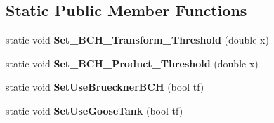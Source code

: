 \subsection*{Static Public Member Functions}
\begin{DoxyCompactItemize}
\item 
\mbox{\label{classOperator_a6f505221635444cb0b489b9ac600fd61}} 
static void {\bfseries Set\+\_\+\+B\+C\+H\+\_\+\+Transform\+\_\+\+Threshold} (double x)
\item 
\mbox{\label{classOperator_a2c42843a1a557f2ab568d106e8fd23e8}} 
static void {\bfseries Set\+\_\+\+B\+C\+H\+\_\+\+Product\+\_\+\+Threshold} (double x)
\item 
\mbox{\label{classOperator_a574e27d0c3ddc107b51eafcb6bfd4b99}} 
static void {\bfseries Set\+Use\+Brueckner\+B\+CH} (bool tf)
\item 
\mbox{\label{classOperator_a02668429f1779193801219a2b45e4776}} 
static void {\bfseries Set\+Use\+Goose\+Tank} (bool tf)
\end{DoxyCompactItemize}
